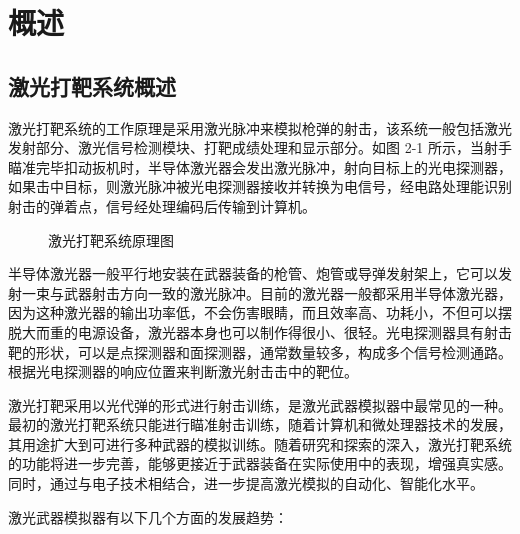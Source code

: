 \chapter{概述}

\section{激光打靶系统概述}

激光打靶系统\cite{cn1,cn2,cn3}的工作原理是采用激光脉冲来模拟枪弹的射击，该系统一般包括激光发射部分、激光信号检测模块、打靶成绩处理和显示部分。如图 2-1 所示，当射手瞄准完毕扣动扳机时，半导体激光器会发出激光脉冲，射向目标上的光电探测器，如果击中目标，则激光脉冲被光电探测器接收并转换为电信号，经电路处理能识别射击的弹着点，信号经处理编码后传输到计算机。

\begin{figure}[htbp]
  \centering
  \caption{激光打靶系统原理图}
\end{figure}

半导体激光器\cite{cn4,en5}一般平行地安装在武器装备的枪管、炮管或导弹发射架上，它可以发射一束与武器射击方向一致的激光脉冲。目前的激光器一般都采用半导体激光器，因为这种激光器的输出功率低，不会伤害眼睛，而且效率高、功耗小，不但可以摆脱大而重的电源设备，激光器本身也可以制作得很小、很轻。光电探测器\cite{en6}具有射击靶的形状，可以是点探测器和面探测器，通常数量较多，构成多个信号检测通路。根据光电探测器的响应位置来判断激光射击击中的靶位。

激光打靶采用以光代弹的形式进行射击训练，是激光武器模拟器中最常见的一种。最初的激光打靶系统只能进行瞄准射击训练，随着计算机和微处理器技术的发展，其用途扩大到可进行多种武器的模拟训练。随着研究和探索的深入，激光打靶系统的功能将进一步完善，能够更接近于武器装备在实际使用中的表现，增强真实感。同时，通过与电子技术相结合，进一步提高激光模拟的自动化、智能化水平。

激光武器模拟器有以下几个方面的发展趋势：


